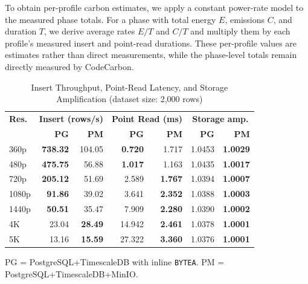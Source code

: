 \documentclass[conference]{IEEEtran}
\begin{document}
To obtain per-profile carbon estimates, we apply a constant power-rate model to the measured phase totals. For a phase with total energy $E$, emissions $C$, and duration $T$, we derive average rates $E/T$ and $C/T$ and multiply them by each profile's measured insert and point-read durations. These per-profile values are estimates rather than direct measurements, while the phase-level totals remain directly measured by CodeCarbon.

\begin{table}[htbp]
\centering
\renewcommand{\arraystretch}{1.1}
\caption{Insert Throughput, Point-Read Latency, and Storage Amplification (dataset size: 2,000 rows)}
\label{tab:performance_summary}
\begin{tabular}{l rr rr rr}
\hline
\textbf{Res.} & \multicolumn{2}{c}{\textbf{Insert (rows/s)}} & \multicolumn{2}{c}{\textbf{Point Read (ms)}} & \multicolumn{2}{c}{\textbf{Storage amp.}} \\
 & \textbf{PG} & \textbf{PM} & \textbf{PG} & \textbf{PM} & \textbf{PG} & \textbf{PM} \\
\hline
360p  & \textbf{738.32} & 104.05 & \textbf{0.720} & 1.717 & 1.0453 & \textbf{1.0029} \\
480p  & \textbf{475.75} & 56.88 & \textbf{1.017} & 1.163 & 1.0435 & \textbf{1.0017} \\
720p  & \textbf{205.12} & 51.69 & 2.589 & \textbf{1.767} & 1.0394 & \textbf{1.0007} \\
1080p & \textbf{91.86} & 39.02 & 3.641 & \textbf{2.352} & 1.0388 & \textbf{1.0003} \\
1440p & \textbf{50.51} & 35.47 & 7.909 & \textbf{2.280} & 1.0390 & \textbf{1.0002} \\
4K    & 23.04 & \textbf{28.49} & 14.942 & \textbf{2.461} & 1.0378 & \textbf{1.0001} \\
5K    & 13.16 & \textbf{15.59} & 27.322 & \textbf{3.360} & 1.0376 & \textbf{1.0001} \\
\hline
\end{tabular}

\footnotesize PG = PostgreSQL+TimescaleDB with inline \texttt{BYTEA}. PM = PostgreSQL+TimescaleDB+MinIO.
\end{table}
\end{document}
